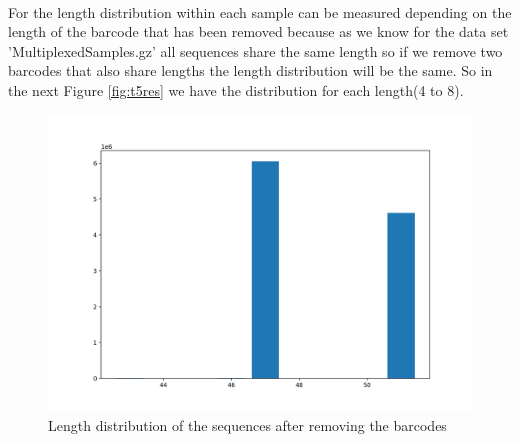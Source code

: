 \documentclass[a4paper,10pt]{article}
\begin{document}
\paragraph{} For the length distribution within each sample can be measured depending on the length of the barcode that has been removed because as we know for the data set 'MultiplexedSamples.gz' all sequences share the same length so if we remove two barcodes that also share lengths the length distribution will be the same. So in the next Figure \ref{fig:t5res} we have the distribution for each length(4 to 8).

\begin{figure}[H]
    \centering
    \includegraphics[width=12cm]{images/length-distr-task5.png}
    \caption{Length distribution of the sequences after removing the barcodes}
    \label{fig:ld4}
\end{figure}

\newpage

\listoffigures

\listoftables
\end{document}
